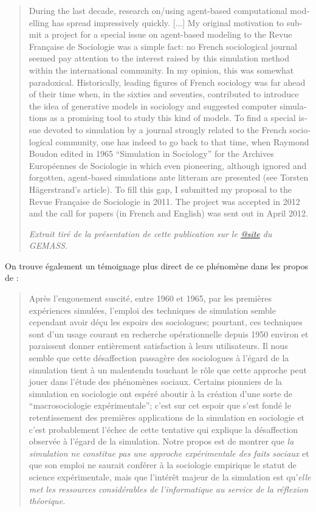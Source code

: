\foreignblockquote{english}[\textit{Extrait tiré de la présentation de cette publication sur le \href{http://www.gemass.org/manzo/writing-agent-based-computational-modeling}{@site} du GEMASS.}]{During the last decade, research on/using agent-based computational modelling has spread impressively quickly. [...] My original motivation to submit a project for a special issue on agent-based modeling to the Revue Française de Sociologie was a simple fact: no French sociological journal seemed pay attention to the interest raised by this simulation method within the international community. In my opinion, this was somewhat paradoxical. Historically, leading figures of French sociology was far ahead of their time when, in the sixties and seventies, contributed to introduce the idea of generative models in sociology and suggested computer simulations as a promising tool to study this kind of models. To find a special issue devoted to simulation by a journal strongly related to the French sociological community, one has indeed to go back to that time, when Raymond Boudon edited in 1965 \enquote{Simulation in Sociology} for the Archives Européennes de Sociologie in which even pioneering, although ignored and forgotten, agent-based simulations ante litteram are presented (see Torsten Hägerstrand’s article). To fill this gap, I submitted my proposal to the Revue Française de Sociologie in 2011. The project was accepted in 2012 and the call for papers (in French and English) was sent out in April 2012.}

On trouve également un témoignage plus direct de ce phénomène dans les propos de \textcite{Gremy1971} :

\blockquote[\cite{Gremy1971}]{Après l'engouement suscité, entre 1960 et 1965, par les premières expériences simulées, l'emploi des techniques de simulation semble cependant avoir déçu les espoirs des sociologues; pourtant, ces techniques sont d'un usage courant en recherche opérationnelle depuis 1950 environ et paraissent donner entièrement satisfaction à leurs utilisateurs. Il nous semble que cette désaffection passagère des sociologues à l'égard de la simulation tient à un malentendu touchant le rôle que cette approche peut jouer dans l'étude des phénomènes sociaux. Certains pionniers de la simulation en sociologie ont espéré aboutir à la création d'une sorte de \enquote{macrosociologie expérimentale}; c'est sur cet espoir que s'est fondé le retentissement des premières applications de la simulation en sociologie et c'est probablement l'échec de cette tentative qui explique la désaffection observée à l'égard de la simulation. Notre propos est de montrer que \textit{la simulation ne constitue pas une approche expérimentale des faits sociaux} et que son emploi ne saurait conférer à la sociologie empirique le statut de science expérimentale, mais que l'intérêt majeur de la simulation est qu'\textit{elle met les ressources considérables de l'informatique au service de la réflexion théorique.}}

